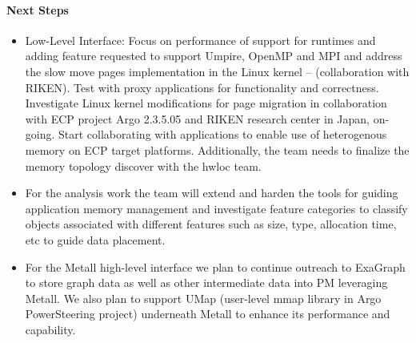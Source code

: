\paragraph{Next Steps}
\begin{itemize}
\item  Low-Level Interface: Focus on performance of support for runtimes and adding feature requested to support Umpire, OpenMP and MPI and address the slow move pages implementation in the Linux kernel – (collaboration with RIKEN). Test with proxy applications for functionality and correctness. Investigate Linux kernel modifications for page migration in collaboration with ECP project Argo 2.3.5.05 and RIKEN research center in Japan, on-going. Start collaborating with applications to enable use of heterogenous memory on ECP target platforms. Additionally, the team needs to finalize the memory topology discover with the hwloc team.
\item For the analysis work the team will extend and harden the tools for guiding application memory management and investigate feature categories to classify objects associated with different features such as size, type, allocation time, etc to guide data placement.
\item For the Metall high-level interface we plan to continue outreach to ExaGraph to store graph data as well as other intermediate data into PM leveraging Metall. We also plan to support UMap (user-level mmap library in Argo PowerSteering project) underneath Metall to enhance its performance and capability.
\end{itemize}


